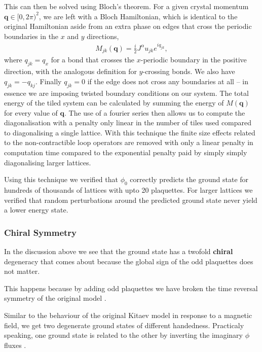 This can then be solved using Bloch's theorem. For a given crystal
momentum \(\textbf{q} \in [0,2\pi)^2\), we are left with a Bloch
Hamiltonian, which is identical to the original Hamiltonian aside from
an extra phase on edges that cross the periodic boundaries in the \(x\)
and \(y\) directions, \[\begin{aligned}
    M_{jk}(\textbf{q}) =  \frac{i}{2} J^{\alpha} u_{jk} e^{i q_{jk}},\end{aligned}\]
where \(q_{jk} = q_x\) for a bond that crosses the \(x\)-periodic
boundary in the positive direction, with the analogous definition for
\(y\)-crossing bonds. We also have \(q_{jk} = -q_{kj}\). Finally
\(q_{jk} = 0\) if the edge does not cross any boundaries at all -- in
essence we are imposing twisted boundary conditions on our system. The
total energy of the tiled system can be calculated by summing the energy
of \(M( \textbf{q})\) for every value of \(\textbf{q}\). The use of a
fourier series then allows us to compute the diagonalisation with a
penalty only linear in the number of tiles used compared to
diagonalising a single lattice. With this technique the finite size
effects related to the non-contractible loop operators are removed with
only a linear penalty in computation time compared to the exponential
penalty paid by simply simply diagonalising larger lattices.

Using this technique we verified that \(\phi_0\) correctly predicts the
ground state for hundreds of thousands of lattices with upto 20
plaquettes. For larger lattices we verified that random perturbations
around the predicted ground state never yield a lower energy state.

\hypertarget{chiral-symmetry}{%
\subsubsection{Chiral Symmetry}\label{chiral-symmetry}}

In the discussion above we see that the ground state has a twofold
\textbf{chiral} degeneracy that comes about because the global sign of
the odd plaquettes does not matter.

This happens because by adding odd plaquettes we have broken the time
reversal symmetry of the original model
\autocite{Chua2011,yaoExactChiralSpin2007,ChuaPRB2011,Fiete2012,Natori2016,Wu2009,Peri2020,WangHaoranPRB2021}.

Similar to the behaviour of the original Kitaev model in response to a
magnetic field, we get two degenerate ground states of different
handedness. Practicaly speaking, one ground state is related to the
other by inverting the imaginary \(\phi\) fluxes
\autocite{yaoExactChiralSpin2007}.

